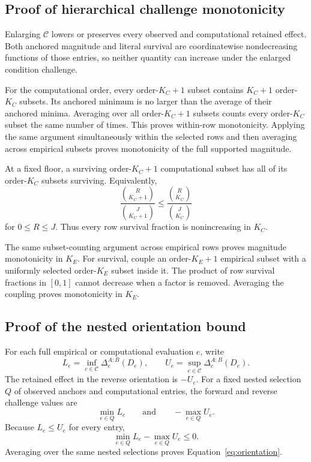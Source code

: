 \documentclass[11pt]{article}
\newcommand{\CSet}{\mathcal{C}}
\theoremstyle{remark}
\begin{document}
\subsection{Proof of hierarchical challenge monotonicity}
\label{app:proof-monotonicity}

Enlarging $\CSet$ lowers or preserves every observed and computational retained
effect. Both anchored magnitude and literal survival are coordinatewise
nondecreasing functions of those entries, so neither quantity can increase
under the enlarged condition challenge.

For the computational order, every order-$K_C+1$ subset contains
$K_C+1$ order-$K_C$ subsets. Its anchored minimum is no larger than the
average of their anchored minima. Averaging over all order-$K_C+1$ subsets
counts every order-$K_C$ subset the same number of times. This proves
within-row monotonicity. Applying the same argument simultaneously within the
selected rows and then averaging across empirical subsets proves monotonicity
of the full supported magnitude.

At a fixed floor, a surviving order-$K_C+1$ computational subset has all of
its order-$K_C$ subsets surviving. Equivalently,
\[
\frac{\binom{R}{K_C+1}}{\binom{J}{K_C+1}}
\leq
\frac{\binom{R}{K_C}}{\binom{J}{K_C}}
\]
for $0\leq R\leq J$. Thus every row survival fraction is nonincreasing in
$K_C$.

The same subset-counting argument across empirical rows proves magnitude
monotonicity in $K_E$. For survival, couple an order-$K_E+1$ empirical subset
with a uniformly selected order-$K_E$ subset inside it. The product of row
survival fractions in $[0,1]$ cannot decrease when a factor is removed.
Averaging the coupling proves monotonicity in $K_E$.

\subsection{Proof of the nested orientation bound}
\label{app:proof-orientation}

For each full empirical or computational evaluation $e$, write
\[
L_e=\inf_{c\in\CSet}\Delta_c^{A:B}(D_e),
\qquad
U_e=\sup_{c\in\CSet}\Delta_c^{A:B}(D_e).
\]
The retained effect in the reverse orientation is $-U_e$. For a fixed nested
selection $Q$ of observed anchors and computational entries, the forward and
reverse challenge values are
\[
\min_{e\in Q}L_e
\qquad\text{and}\qquad
-\max_{e\in Q}U_e.
\]
Because $L_e\leq U_e$ for every entry,
\[
\min_{e\in Q}L_e-\max_{e\in Q}U_e\leq0.
\]
Averaging over the same nested selections proves
Equation~\eqref{eq:orientation}.
\end{document}
